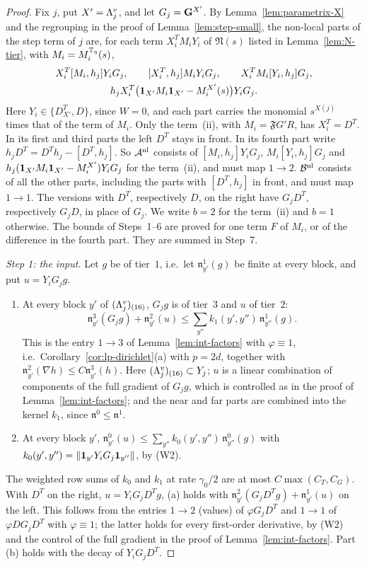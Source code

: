 \begin{proof}
Fix $j$, put $X'=\Lambda^v_j$, and let $G_j=\mathbf G^{X'}$. By Lemma~\ref{lem:parametrix-X} and the regrouping in the proof of Lemma~\ref{lem:step-small}, the non-local parts of the step term of $j$ are, for each term $X_i^TM_iY_i$ of $\mathfrak N(s)$ listed in Lemma~\ref{lem:N-tier}, with $M_i=M_i^{\mathbb T_\eta}(s)$,
\[
\begin{gathered}
X_i^T[M_i,h_j]Y_iG_j,\qquad[X_i^T,h_j]M_iY_iG_j,\qquad X_i^TM_i[Y_i,h_j]G_j,\\
h_jX_i^T\big(\mathbf 1_{X'}M_i\mathbf 1_{X'}-M_i^{X'}(s)\big)Y_iG_j .
\end{gathered}
\]
Here $Y_i\in\{D^T_{X'},D\}$, since $W=0$, and each part carries the monomial $s^{X(j)}$ times that of the term of $M_i$. Only the term~(ii), with $M_i=\mathfrak FG'R$, has $X_i^T=D^T$. In its first and third parts the left $D^T$ stays in front. In its fourth part write $h_jD^T=D^Th_j-[D^T,h_j]$. So $\mathcal A^{\rm nl}$ consists of $[M_i,h_j]Y_iG_j$, $M_i[Y_i,h_j]G_j$ and $h_j(\mathbf 1_{X'}M_i\mathbf 1_{X'}-M_i^{X'})Y_iG_j$ for the term~(ii), and must map $1\to2$. $\mathcal B^{\rm nl}$ consists of all the other parts, including the parts with $[D^T,h_j]$ in front, and must map $1\to1$. The versions with $D^T$, respectively $D$, on the right have $G_jD^T$, respectively $G_jD$, in place of $G_j$. We write $b=2$ for the term~(ii) and $b=1$ otherwise. The bounds of Steps~1--6 are proved for one term $F$ of $M_i$, or of the difference in the fourth part. They are summed in Step~7.

\emph{Step 1: the input.} Let $g$ be of tier~$1$, i.e.\ let $\mathfrak n^1_{y'}(g)$ be finite at every block, and put $u=Y_iG_jg$.
\begin{enumerate}[label=(\alph*)]
\item At every block $y'$ of $(\Lambda^v_j)_{(16)}$, $G_jg$ is of tier~$3$ and $u$ of tier~$2$:
\[
\mathfrak n^3_{y'}(G_jg)+\mathfrak n^2_{y'}(u)\le\sum_{y''}k_1(y',y'')\,\mathfrak n^1_{y''}(g).
\]
This is the entry $1\to3$ of Lemma~\ref{lem:int-factors} with $\varphi\equiv1$, i.e.\ Corollary~\ref{cor:lp-dirichlet}(a) with $p=2d$, together with $\mathfrak n^2_{y'}(\nabla h)\le C\mathfrak n^3_{y'}(h)$. Here $(\Lambda^v_j)_{(16)}\subset Y_j$; $u$ is a linear combination of components of the full gradient of $G_jg$, which is controlled as in the proof of Lemma~\ref{lem:int-factors}; and the near and far parts are combined into the kernel $k_1$, since $\mathfrak n^0\le\mathfrak n^1$.
\item At every block $y'$, $\mathfrak n^0_{y'}(u)\le\sum_{y''}k_0(y',y'')\,\mathfrak n^0_{y''}(g)$ with $k_0(y',y'')=\|\mathbf 1_{y'}Y_iG_j\mathbf 1_{y''}\|$, by (W2).
\end{enumerate}
The weighted row sums of $k_0$ and $k_1$ at rate $\gamma_0/2$ are at most $C\max(C_T,C_G)$. With $D^T$ on the right, $u=Y_iG_jD^Tg$, (a) holds with $\mathfrak n^2_{y'}(G_jD^Tg)+\mathfrak n^1_{y'}(u)$ on the left. This follows from the entries $1\to2$ (values) of $\varphi G_jD^T$ and $1\to1$ of $\varphi DG_jD^T$ with $\varphi\equiv1$; the latter holds for every first-order derivative, by (W2) and the control of the full gradient in the proof of Lemma~\ref{lem:int-factors}. Part (b) holds with the decay of $Y_iG_jD^T$.


\end{proof}
